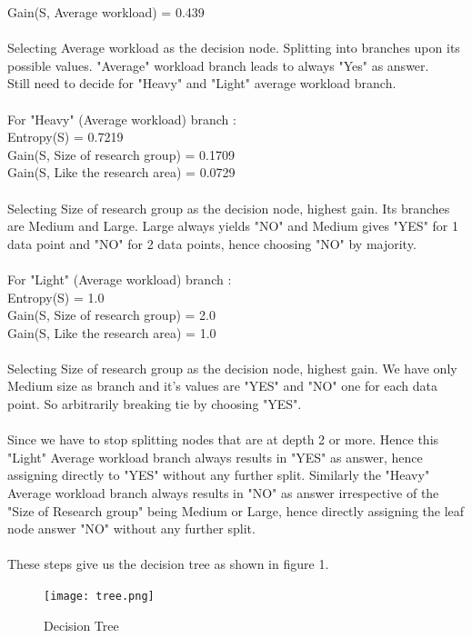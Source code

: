 \documentclass[a4paper,11pt]{article}
\begin{document}
\begin{mlsolution}
Gain(S, Average workload) = 0.439\\\\Selecting Average workload as the decision node. Splitting into branches upon its possible values. "Average" workload branch leads to always "Yes" as answer.\\Still need to decide for "Heavy" and "Light" average workload branch.\\\\For "Heavy" (Average workload) branch :\\Entropy(S) = 0.7219\\
Gain(S, Size of research group) = 0.1709\\
Gain(S, Like the research area) = 0.0729\\\\Selecting Size of research group as the decision node, highest gain.
Its branches are Medium and Large. Large always yields "NO" and Medium gives "YES" for 1 data point and "NO" for 2 data points, hence choosing "NO" by majority.\\\\For "Light" (Average workload) branch :\\
Entropy(S) = 1.0\\
Gain(S, Size of research group) = 2.0\\
Gain(S, Like the research area) = 1.0\\\\Selecting Size of research group as the decision node, highest gain. We have only Medium size as branch and it's values are "YES" and "NO" one for each data point. So arbitrarily breaking tie by choosing "YES".\\\\Since we have to stop splitting nodes that are at depth 2 or more. Hence this "Light" Average workload branch always results in "YES" as answer, hence assigning directly to "YES" without any further split. Similarly the "Heavy" Average workload branch always results in "NO" as answer irrespective of the "Size of Research group" being Medium or Large, hence directly assigning the leaf node answer "NO" without any further split.\\\\These steps give us the decision tree as shown in figure 1.

\begin{figure}[th]%
\centering
\texttt{[image: tree.png]}%

\caption{Decision Tree}%
\label{fig:Dtree}%
\end{figure}



\end{mlsolution}
\end{document}
